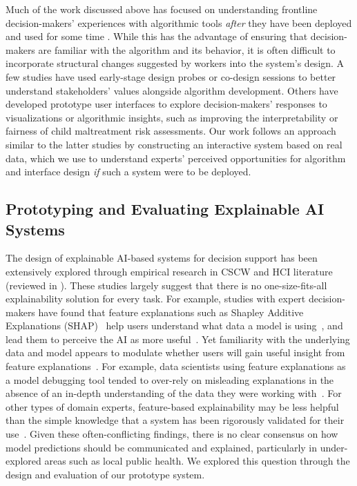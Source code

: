 Much of the work discussed above has focused on understanding frontline decision-makers' experiences with algorithmic tools \textit{after} they have been deployed and used for some time \cite{Kawakami2022partnerships,Kuo2023,Beede2020}. While this has the advantage of ensuring that decision-makers are familiar with the algorithm and its behavior, it is often difficult to incorporate structural changes suggested by workers into the system's design. A few studies have used early-stage design probes \cite{Kawakami2022} or co-design sessions \cite{HoltenMoller2020} to better understand stakeholders' values alongside algorithm development. Others have developed prototype user interfaces to explore decision-makers' responses to visualizations or algorithmic insights, such as improving the interpretability \cite{Zytek2021} or fairness \cite{Cheng2021} of child maltreatment risk assessments. Our work follows an approach similar to the latter studies by constructing an interactive system based on real data, which we use to understand experts' perceived opportunities for algorithm and interface design \textit{if} such a system were to be deployed.

\subsection{Prototyping and Evaluating Explainable AI Systems}

The design of explainable AI-based systems for decision support has been extensively explored through empirical research in CSCW and HCI literature (reviewed in \cite{lai_towards_2023,rong_towards_2024}).
These studies largely suggest that there is no one-size-fits-all explainability solution for every task.
For example, studies with expert decision-makers have found that feature explanations such as Shapley Additive Explanations (SHAP)~\cite{Lundberg2017} help users understand what data a model is using~\cite{Zytek2021,Cheng2019}, and lead them to perceive the AI as more useful~\cite{Sivaraman2023}.
Yet familiarity with the underlying data and model appears to modulate whether users will gain useful insight from feature explanations~\cite{Wang2020}.
For example, data scientists using feature explanations as a model debugging tool tended to over-rely on misleading explanations in the absence of an in-depth understanding of the data they were working with~\cite{kaur_interpreting_2020}.
For other types of domain experts, feature-based explainability may be less helpful than the simple knowledge that a system has been rigorously validated for their use~\cite{Ghassemi2021,amann_explain_2022}.
Given these often-conflicting findings, there is no clear consensus on how model predictions should be communicated and explained, particularly in under-explored areas such as local public health.
We explored this question through the design and evaluation of our prototype system.

